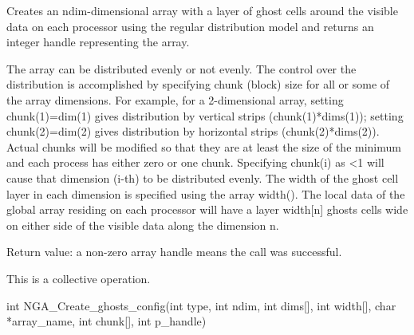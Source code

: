 \documentclass[12pt]{article}
\begin{document}
\begin{desc}

  Creates an ndim-dimensional array with a layer of ghost cells around
  the visible data on each processor using the regular distribution
  model and returns an integer handle representing the array.

  The array can be distributed evenly or not evenly. The control over
  the distribution is accomplished by specifying chunk (block) size
  for all or some of the array dimensions. For example, for a
  2-dimensional array, setting chunk(1)=dim(1) gives distribution by
  vertical strips (chunk(1)*dims(1)); setting chunk(2)=dim(2) gives
  distribution by horizontal strips (chunk(2)*dims(2)). Actual chunks
  will be modified so that they are at least the size of the minimum
  and each process has either zero or one chunk. Specifying chunk(i)
  as \textless 1 will cause that dimension (i-th) to be distributed evenly. The
  width of the ghost cell layer in each dimension is specified using
  the array width(). The local data of the global array residing on
  each processor will have a layer width[n] ghosts cells wide on
  either side of the visible data along the dimension n.

  Return value: a non-zero array handle means the call was successful.

  This is a collective operation.
\end{desc}



\begin{capi}
\begin{ccode}
int NGA_Create_ghosts_config(int type, int ndim, int dims[], 
                             int width[], char *array_name, int chunk[], 
                             int p_handle)
\end{ccode}
\begin{funcargs}
\end{funcargs}
\end{capi}
\end{document}
